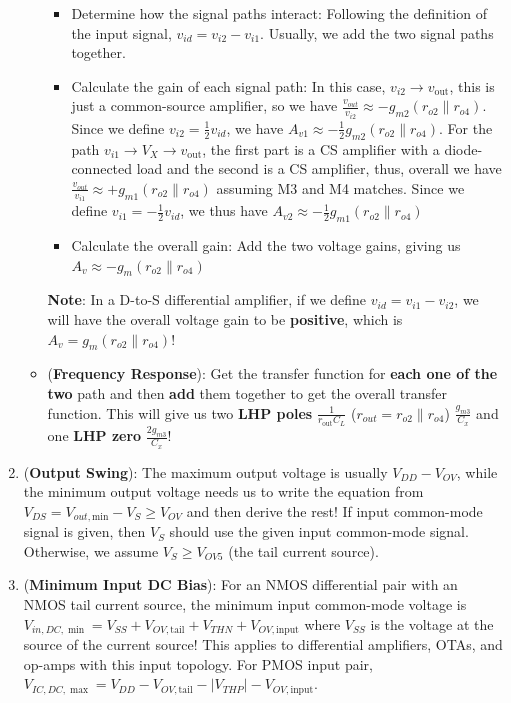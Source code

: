\documentclass[10pt, landscape]{article}
\begin{document}
\begin{multicols}{4}
\begin{enumerate}
\begin{itemize}
\begin{itemize}
            \item Determine how the signal paths interact: Following the definition of the input signal, $v_{id}=v_{i2}-v_{i1}$. Usually, we add the two signal paths together.
            \item Calculate the gain of each signal path: In this case, $v_{i2}\rightarrow v_{\text{out}}$, this is just a common-source amplifier, so we have $\frac{v_{out}}{v_{i2}}\approx-g_{m2}(r_{o2}\parallel r_{o4})$. Since we define $v_{i2}=\frac12v_{id}$, we have $A_{v1}\approx-\frac12g_{m2}(r_{o2}\parallel r_{o4})$. For the path $v_{i1}\rightarrow V_{X}\rightarrow v_{\text{out}}$, the first part is a CS amplifier with a diode-connected load and the second is a CS amplifier, thus, overall we have $\frac{v_{out}}{v_{i1}}\approx+g_{m1}(r_{o2}\parallel r_{o4})$ assuming M3 and M4 matches. Since we define $v_{i1}=-\frac12v_{id}$, we thus have $A_{v2}\approx-\frac12g_{m1}(r_{o2}\parallel r_{o4})$
            \item Calculate the overall gain: Add the two voltage gains, giving us $A_v\approx-g_m(r_{o2}\parallel r_{o4})$
        \end{itemize}
        \textbf{Note}: In a D-to-S differential amplifier, if we define $v_{id}=v_{i1}-v_{i2}$, we will have the overall voltage gain to be \textbf{positive}, which is $A_v=g_m(r_{o2}\parallel r_{o4})$!
        \item (\textbf{Frequency Response}): Get the transfer function for \textbf{each one of the two} path and then \textbf{add} them together to get the overall transfer function. This will give us two \textbf{LHP poles} $\frac{1}{r_{\text{out}}C_L}$ ($r_{out}=r_{o2}\parallel r_{o4}$) $\frac{g_{m3}}{C_x}$ and one \textbf{LHP zero} $\frac{2g_{m3}}{C_x}$!
    \end{itemize}
    \item (\textbf{Output Swing}): The maximum output voltage is usually $V_{DD}-V_{OV}$, while the minimum output voltage needs us to write the equation from $V_{DS}=V_{out,\text{min}}-V_{S}\geq V_{OV}$ and then derive the rest! If input common-mode signal is given, then $V_S$ should use the given input common-mode signal. Otherwise, we assume $V_S\geq V_{OV5}$ (the tail current source).
    \item (\textbf{Minimum Input DC Bias}): For an NMOS differential pair with an NMOS tail current source, the minimum input common-mode voltage is $V_{in,DC,\min}=V_{SS}+V_{OV,\text{tail}}+V_{THN}+V_{OV,\text{input}}$ where $V_{SS}$ is the voltage at the source of the current source! This applies to differential amplifiers, OTAs, and op-amps with this input topology. For PMOS input pair, $V_{IC,DC,\max}=V_{DD}-V_{OV,\text{tail}}-|V_{THP}|-V_{OV,\text{input}}$.

\end{enumerate}
\end{multicols}
\end{document}
